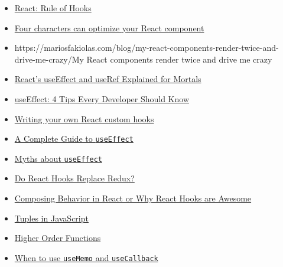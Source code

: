 \begin{itemize}[leftmargin=*]
    \item \href{http://reactjs.org/docs/hooks-rules.html}{React: Rule of Hooks}
    \item \href{https://www.benmvp.com/blog/four-characters-optimize-react-component/}{Four characters can optimize your React component}
    \item {https://mariosfakiolas.com/blog/my-react-components-render-twice-and-drive-me-crazy/}{My React components render twice and drive me crazy}
    \item \href{https://leewarrick.com/blog/react-use-effect-explained/}{React's useEffect and useRef Explained for Mortals}
    \item \href{https://medium.com/swlh/useeffect-4-tips-every-developer-should-know-54b188b14d9c}{useEffect: 4 Tips Every Developer Should Know}
    \item \href{https://tvernon.tech/blog/react-custom-hook-for-forms}{Writing your own React custom hooks}
    \item \href{https://overreacted.io/a-complete-guide-to-useeffect/}{A Complete Guide to \texttt{useEffect}}
    \item \href{https://epicreact.dev/myths-about-useeffect/}{Myths about \texttt{useEffect}}
    \item \href{https://medium.com/javascript-scene/do-react-hooks-replace-redux-210bab340672}{Do React Hooks Replace Redux?}
    \item \href{https://www.youtube.com/watch?v=nUzLlHFVXx0}{Composing Behavior in React or Why React Hooks are Awesome}
    \item \href{https://medium.com/@ntgard/tuples-in-javascript-cd33321e5277}{Tuples in JavaScript}
    \item \href{https://eloquentjavascript.net/05_higher_order.html}{Higher Order Functions}
    \item \href{https://kentcdodds.com/blog/usememo-and-usecallback/}{When to use \texttt{useMemo} and \texttt{useCallback}}
\end{itemize}
